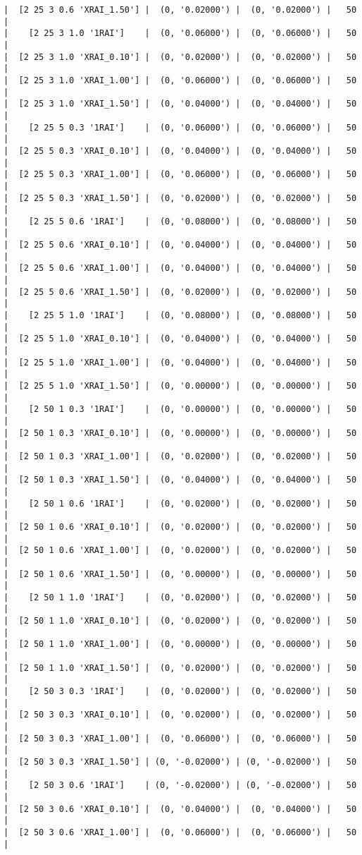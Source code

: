 \documentclass{article}
\begin{document}
\begin{verbatim}
|  [2 25 3 0.6 'XRAI_1.50'] |  (0, '0.02000') |  (0, '0.02000') |   50  |
|    [2 25 3 1.0 '1RAI']    |  (0, '0.06000') |  (0, '0.06000') |   50  |
|  [2 25 3 1.0 'XRAI_0.10'] |  (0, '0.02000') |  (0, '0.02000') |   50  |
|  [2 25 3 1.0 'XRAI_1.00'] |  (0, '0.06000') |  (0, '0.06000') |   50  |
|  [2 25 3 1.0 'XRAI_1.50'] |  (0, '0.04000') |  (0, '0.04000') |   50  |
|    [2 25 5 0.3 '1RAI']    |  (0, '0.06000') |  (0, '0.06000') |   50  |
|  [2 25 5 0.3 'XRAI_0.10'] |  (0, '0.04000') |  (0, '0.04000') |   50  |
|  [2 25 5 0.3 'XRAI_1.00'] |  (0, '0.06000') |  (0, '0.06000') |   50  |
|  [2 25 5 0.3 'XRAI_1.50'] |  (0, '0.02000') |  (0, '0.02000') |   50  |
|    [2 25 5 0.6 '1RAI']    |  (0, '0.08000') |  (0, '0.08000') |   50  |
|  [2 25 5 0.6 'XRAI_0.10'] |  (0, '0.04000') |  (0, '0.04000') |   50  |
|  [2 25 5 0.6 'XRAI_1.00'] |  (0, '0.04000') |  (0, '0.04000') |   50  |
|  [2 25 5 0.6 'XRAI_1.50'] |  (0, '0.02000') |  (0, '0.02000') |   50  |
|    [2 25 5 1.0 '1RAI']    |  (0, '0.08000') |  (0, '0.08000') |   50  |
|  [2 25 5 1.0 'XRAI_0.10'] |  (0, '0.04000') |  (0, '0.04000') |   50  |
|  [2 25 5 1.0 'XRAI_1.00'] |  (0, '0.04000') |  (0, '0.04000') |   50  |
|  [2 25 5 1.0 'XRAI_1.50'] |  (0, '0.00000') |  (0, '0.00000') |   50  |
|    [2 50 1 0.3 '1RAI']    |  (0, '0.00000') |  (0, '0.00000') |   50  |
|  [2 50 1 0.3 'XRAI_0.10'] |  (0, '0.00000') |  (0, '0.00000') |   50  |
|  [2 50 1 0.3 'XRAI_1.00'] |  (0, '0.02000') |  (0, '0.02000') |   50  |
|  [2 50 1 0.3 'XRAI_1.50'] |  (0, '0.04000') |  (0, '0.04000') |   50  |
|    [2 50 1 0.6 '1RAI']    |  (0, '0.02000') |  (0, '0.02000') |   50  |
|  [2 50 1 0.6 'XRAI_0.10'] |  (0, '0.02000') |  (0, '0.02000') |   50  |
|  [2 50 1 0.6 'XRAI_1.00'] |  (0, '0.02000') |  (0, '0.02000') |   50  |
|  [2 50 1 0.6 'XRAI_1.50'] |  (0, '0.00000') |  (0, '0.00000') |   50  |
|    [2 50 1 1.0 '1RAI']    |  (0, '0.02000') |  (0, '0.02000') |   50  |
|  [2 50 1 1.0 'XRAI_0.10'] |  (0, '0.02000') |  (0, '0.02000') |   50  |
|  [2 50 1 1.0 'XRAI_1.00'] |  (0, '0.00000') |  (0, '0.00000') |   50  |
|  [2 50 1 1.0 'XRAI_1.50'] |  (0, '0.02000') |  (0, '0.02000') |   50  |
|    [2 50 3 0.3 '1RAI']    |  (0, '0.02000') |  (0, '0.02000') |   50  |
|  [2 50 3 0.3 'XRAI_0.10'] |  (0, '0.02000') |  (0, '0.02000') |   50  |
|  [2 50 3 0.3 'XRAI_1.00'] |  (0, '0.06000') |  (0, '0.06000') |   50  |
|  [2 50 3 0.3 'XRAI_1.50'] | (0, '-0.02000') | (0, '-0.02000') |   50  |
|    [2 50 3 0.6 '1RAI']    | (0, '-0.02000') | (0, '-0.02000') |   50  |
|  [2 50 3 0.6 'XRAI_0.10'] |  (0, '0.04000') |  (0, '0.04000') |   50  |
|  [2 50 3 0.6 'XRAI_1.00'] |  (0, '0.06000') |  (0, '0.06000') |   50  |

\end{verbatim}
\end{document}
